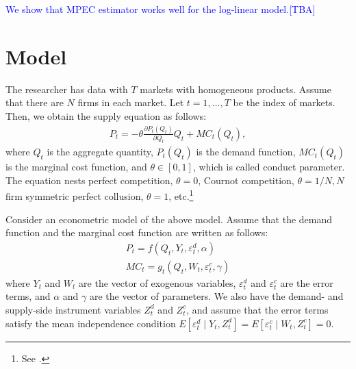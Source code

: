\documentclass[11pt, a4paper]{article}
\begin{document}
\textcolor{blue}{We show that MPEC estimator works well for the log-linear model.[TBA]}


\section{Model}
The researcher has data with $T$ markets with homogeneous products.
Assume that there are $N$ firms in each market.
Let $t = 1,\ldots, T$ be the index of markets.
Then, we obtain the supply equation as follows:
\begin{align}
     P_t = -\theta\frac{\partial P_t(Q_{t})}{\partial Q_{t}}Q_{t} + MC_t(Q_{t}),\label{eq:supply_equation}
\end{align}
where $Q_{t}$ is the aggregate quantity, $P_t(Q_{t})$ is the demand function, $MC_{t}(Q_{t})$ is the marginal cost function, and $\theta\in[0,1]$, which is called conduct parameter. 
The equation nests perfect competition, $\theta=0$, Cournot competition, $\theta=1/N, N$ firm symmetric perfect collusion, $\theta=1$, etc.\footnote{See \cite{bresnahan1982oligopoly}.} 

Consider an econometric model of the above model.
Assume that the demand function and the marginal cost function are written as follows: 
\begin{align}
    P_t = f(Q_{t}, Y_t, \varepsilon^{d}_{t}, \alpha) \label{eq:demand}\\
    MC_t = g_{t}(Q_{t}, W_{t}, \varepsilon^{c}_{t}, \gamma)\label{eq:marginal_cost}
\end{align}
where $Y_t$ and $W_{t}$ are the vector of exogenous variables, $\varepsilon^{d}_{t}$ and $\varepsilon^{c}_{t}$ are the error terms, and $\alpha$ and $\gamma$ are the vector of parameters.
We also have the demand- and supply-side instrument variables $Z^{d}_{t}$ and $Z^{c}_{t}$, and assume that the error terms satisfy the mean independence condition $E[\varepsilon^{d}_{t}\mid Y_t, Z^{d}_{t}] = E[\varepsilon^{c}_{t} \mid W_{t}, Z^{c}_{t}] =0$.
\end{document}
